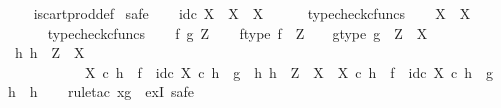 \begin{isabellebody}
\ \ %
\endisadelimproof
%
\isatagproof
{}\isamarkupfalse%
\ is{\isacharunderscore}{\kern0pt}cart{\isacharunderscore}{\kern0pt}prod{\isacharunderscore}{\kern0pt}def\isanewline
{}\isamarkupfalse%
\ safe\isanewline
\ \ \isamarkupfalse%
\ {\isachardoublequoteopen}id\isactrlsub c\ X\ {\isacharcolon}{\kern0pt}\ X\ {\isasymrightarrow}\ X{\isachardoublequoteclose}\isanewline
\ \ \ \ \isamarkupfalse%
\ typecheck{\isacharunderscore}{\kern0pt}cfuncs\isanewline
{}\isamarkupfalse%
\isanewline
\ \ \isamarkupfalse%
\ {\isachardoublequoteopen}{\isasymbeta}\isactrlbsub X\isactrlesub \ {\isacharcolon}{\kern0pt}\ X\ {\isasymrightarrow}\ {\isasymone}{\isachardoublequoteclose}\isanewline
\ \ \ \ \isamarkupfalse%
\ typecheck{\isacharunderscore}{\kern0pt}cfuncs\isanewline
{}\isamarkupfalse%
\isanewline
\ \ \isamarkupfalse%
\ f\ g\ Z\isanewline
\ \ \isamarkupfalse%
\ f{\isacharunderscore}{\kern0pt}type{\isacharcolon}{\kern0pt}\ {\isachardoublequoteopen}f\ {\isacharcolon}{\kern0pt}\ Z\ {\isasymrightarrow}\ {\isasymone}{\isachardoublequoteclose}\ \ g{\isacharunderscore}{\kern0pt}type{\isacharcolon}{\kern0pt}\ {\isachardoublequoteopen}g\ {\isacharcolon}{\kern0pt}\ Z\ {\isasymrightarrow}\ X{\isachardoublequoteclose}\isanewline
\ \ \isamarkupfalse%
\ \isamarkupfalse%
\ {\isachardoublequoteopen}{\isasymexists}h{\isachardot}{\kern0pt}\ h\ {\isacharcolon}{\kern0pt}\ Z\ {\isasymrightarrow}\ X\ {\isasymand}\isanewline
\ \ \ \ \ \ \ \ \ \ \ {\isasymbeta}\isactrlbsub X\isactrlesub \ {\isasymcirc}\isactrlsub c\ h\ {\isacharequal}{\kern0pt}\ f\ {\isasymand}\ id\isactrlsub c\ X\ {\isasymcirc}\isactrlsub c\ h\ {\isacharequal}{\kern0pt}\ g\ {\isasymand}\ {\isacharparenleft}{\kern0pt}{\isasymforall}h{}{\isachardot}{\kern0pt}\ h{}\ {\isacharcolon}{\kern0pt}\ Z\ {\isasymrightarrow}\ X\ {\isasymand}\ {\isasymbeta}\isactrlbsub X\isactrlesub \ {\isasymcirc}\isactrlsub c\ h{}\ {\isacharequal}{\kern0pt}\ f\ {\isasymand}\ id\isactrlsub c\ X\ {\isasymcirc}\isactrlsub c\ h{}\ {\isacharequal}{\kern0pt}\ g\ {\isasymlongrightarrow}\ h{}\ {\isacharequal}{\kern0pt}\ h{\isacharparenright}{\kern0pt}{\isachardoublequoteclose}\isanewline
\ \ \isamarkupfalse%
\ {\isacharparenleft}{\kern0pt}rule{\isacharunderscore}{\kern0pt}tac\ x{\isacharequal}{\kern0pt}g\ \ exI{\isacharcomma}{\kern0pt}\ safe{\isacharparenright}{\kern0pt}\isanewline

\end{isabellebody}
